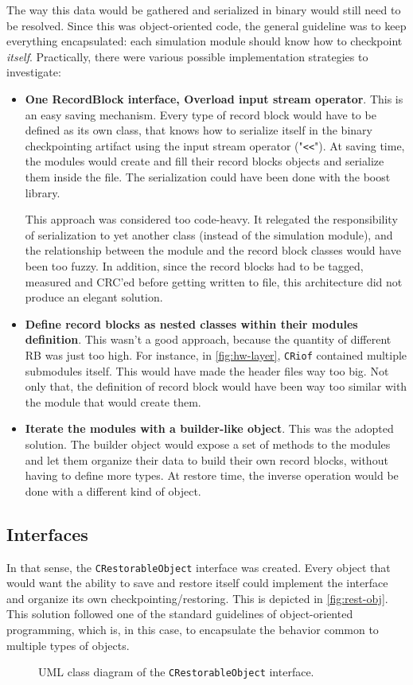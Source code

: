 {The way this data would be gathered and serialized in binary would still need to be resolved. Since this was object-oriented code, the general guideline was to keep everything encapsulated: each simulation module should know how to checkpoint \textit{itself}. Practically, there were various possible implementation strategies to investigate:
\begin{itemize}
	\item \textbf{One RecordBlock interface, Overload input stream operator}. This is an easy saving mechanism. Every type of record block would have to be defined as its own class, that knows how to serialize itself in the binary checkpointing artifact using the input stream operator ("\texttt{<<}"). At saving time, the modules would create and fill their record blocks objects and serialize them inside the file. The serialization could have been done with the boost library\cite{online:boost}.
	
	This approach was considered too code-heavy. It relegated the responsibility of serialization to yet another class (instead of the simulation module), and the relationship between the module and the record block classes would have been too fuzzy. In addition, since the record blocks had to be tagged, measured and CRC'ed before getting written to file, this architecture did not produce an elegant solution. 
	\item \textbf{Define record blocks as nested classes within their modules definition}. This wasn't a good approach, because the quantity of different \gls{RB} was just too high. For instance, in \autoref{fig:hw-layer}, \texttt{CRiof} contained multiple submodules itself. This would have made the header files way too big. Not only that, the definition of record block would have been way too similar with the module that would create them. 
	\item \textbf{Iterate the modules with a builder-like object}. This was the adopted solution. The builder object would expose a set of methods to the modules and let them organize their data to build their own record blocks, without having to define more types. At restore time, the inverse operation would be done with a different kind of object.
\end{itemize}

\subsection*{\Cpp Interfaces}
In that sense, the \texttt{CRestorableObject} interface was created. Every object that would want the ability to save and restore itself could implement the interface and organize its own checkpointing/restoring. This is depicted in \autoref{fig:rest-obj}. This solution followed one of the standard guidelines of object-oriented programming, which is, in this case, to encapsulate the behavior common to multiple types of objects. 
\begin{figure}[htbp]
	\centering
	\vspace{12pt}
	\footnotesize
	
	\caption{UML class diagram of the \texttt{CRestorableObject} interface.}
	\label{fig:rest-obj}
\end{figure}

}
